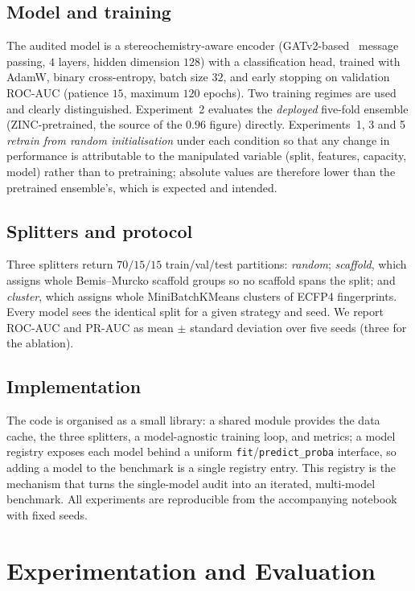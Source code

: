 \documentclass[conference]{IEEEtran}
\begin{document}
\subsection{Model and training}
The audited model is a stereochemistry-aware encoder (GATv2-based~\cite{brody2022}
message passing, $4$ layers, hidden dimension $128$) with a classification head,
trained with AdamW, binary cross-entropy, batch size $32$, and early stopping on
validation ROC-AUC (patience $15$, maximum $120$ epochs). Two training regimes are
used and clearly distinguished. Experiment~2 evaluates the \emph{deployed}
five-fold ensemble (ZINC-pretrained, the source of the $0.96$ figure) directly.
Experiments~1, 3 and 5 \emph{retrain from random initialisation} under each
condition so that any change in performance is attributable to the manipulated
variable (split, features, capacity, model) rather than to pretraining; absolute
values are therefore lower than the pretrained ensemble's, which is expected and
intended.

\subsection{Splitters and protocol}
Three splitters return $70/15/15$ train/val/test partitions: \emph{random};
\emph{scaffold}, which assigns whole Bemis--Murcko scaffold groups so no scaffold
spans the split; and \emph{cluster}, which assigns whole MiniBatchKMeans clusters
of ECFP4 fingerprints. Every model sees the identical split for a given strategy
and seed. We report ROC-AUC and PR-AUC as mean $\pm$ standard deviation over five
seeds (three for the ablation).

\subsection{Implementation}
The code is organised as a small library: a shared module provides the data cache,
the three splitters, a model-agnostic training loop, and metrics; a model registry
exposes each model behind a uniform \texttt{fit}/\texttt{predict\_proba} interface,
so adding a model to the benchmark is a single registry entry. This registry is the
mechanism that turns the single-model audit into an iterated, multi-model
benchmark. All experiments are reproducible from the accompanying notebook with
fixed seeds.

\section{Experimentation and Evaluation}
\end{document}
